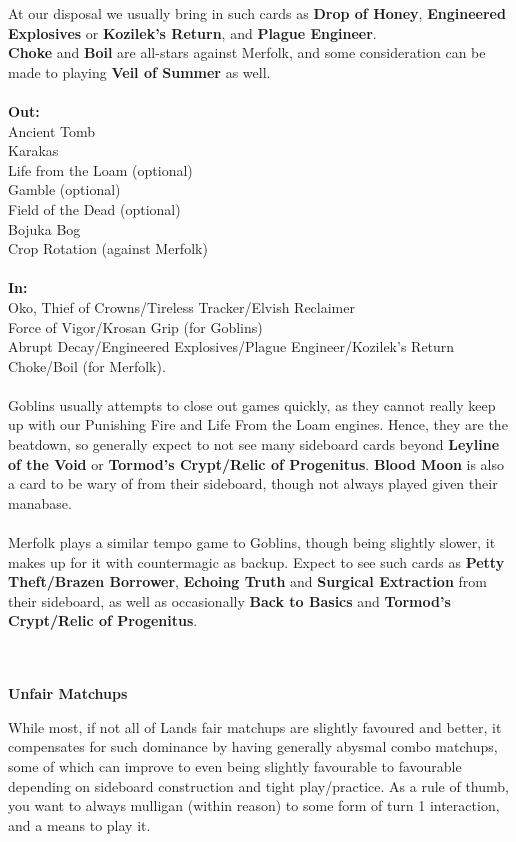 \documentclass{report}
\begin{document}
At our disposal we usually bring in such cards as \textbf{Drop of Honey}, \textbf{Engineered Explosives} or \textbf{Kozilek's Return}, and \textbf{Plague Engineer}.\\ \textbf{Choke} and \textbf{Boil} are all-stars against Merfolk, and some consideration can be made to playing \textbf{Veil of Summer} as well.\\\\
\textbf{Out:}\\
Ancient Tomb\\Karakas\\Life from the Loam (optional)\\Gamble (optional)\\ Field of the Dead (optional)\\Bojuka Bog\\Crop Rotation (against Merfolk)\\\\
\textbf{In:}\\
Oko, Thief of Crowns/Tireless Tracker/Elvish Reclaimer\\Force of Vigor/Krosan Grip (for Goblins)\\Abrupt Decay/Engineered Explosives/Plague Engineer/Kozilek's Return\\Choke/Boil (for Merfolk).\\\\
Goblins usually attempts to close out games quickly, as they cannot really keep up with our Punishing Fire and Life From the Loam engines. Hence, they are the beatdown, so generally expect to not see many sideboard cards beyond \textbf{Leyline of the Void} or \textbf{Tormod's Crypt/Relic of Progenitus}. \textbf{Blood Moon} is also a card to be wary of from their sideboard, though not always played given their manabase.\\\\
Merfolk plays a similar tempo game to Goblins, though being slightly slower, it makes up for it with countermagic as backup. Expect to see such cards as \textbf{Petty Theft/Brazen Borrower}, \textbf{Echoing Truth} and \textbf{Surgical Extraction} from their sideboard, as well as occasionally \textbf{Back to Basics} and \textbf{Tormod's Crypt/Relic of Progenitus}.\\\\\\
\begin{center}
\textbf{Unfair Matchups}
\end{center}
While most, if not all of Lands fair matchups are slightly favoured and better, it compensates for such dominance by having generally abysmal combo matchups, some of which can improve to even being slightly favourable to favourable depending on sideboard construction and tight play/practice. As a rule of thumb, you want to always mulligan (within reason) to some form of turn 1 interaction, and a means to play it.\\\\
\end{document}

